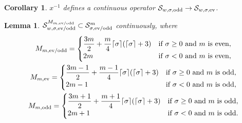 \documentclass[11pt]{article}
\newtheorem{Corollary}[Theorem]{Corollary}
\newtheorem{Lemma}[Theorem]{Lemma}
\renewcommand{\SS}{\mathcal{S}}
\begin{document}
\begin{Corollary}\label{c:x^-1:SS_w,sigma,odd to SS_w,sigma,ev}
  $x^{-1}$ defines a continuous operator $\SS_{w,\sigma,\text{\rm odd}}\to\SS_{w,\sigma,\text{\rm ev}}$.
\end{Corollary}

\begin{Lemma}\label{l:SS_w,sigma^M_m subset SS_sigma^m}
  $\SS_{w,\sigma,\text{\rm ev/odd}}^{M_{m,\text{\rm ev/odd}}}\subset\SS_{\sigma,\text{\rm ev/odd}}^m$ continuously, where
    \begin{gather*}
      M_{m,\text{\rm ev/odd}} =
        \begin{cases}
          \dfrac{3m}{2}+\dfrac{m}{4} \lceil\sigma\rceil(\lceil\sigma\rceil+3) & \text{if $\sigma\ge0$ and $m$ is even},\\
          2m & \text{if $\sigma<0$ and $m$ is even} ,
        \end{cases}
      \\
      M_{m,\text{\rm ev}} =
        \begin{cases}
          \dfrac{3m-1}{2}+\dfrac{m-1}{4} \lceil\sigma\rceil(\lceil\sigma\rceil+3) & \text{if $\sigma\ge0$ and $m$ is odd},\\
          2m-1 & \text{if $\sigma<0$ and $m$ is odd} ,
        \end{cases}
      \\
      M_{m,\text{\rm odd}} =
        \begin{cases}
          \dfrac{3m+1}{2}+\dfrac{m+1}{4} \lceil\sigma\rceil(\lceil\sigma\rceil+3)
          & \text{if $\sigma\ge0$ and $m$ is odd},\\
          2m+1 & \text{if $\sigma<0$ and $m$ is odd} .
        \end{cases}
    \end{gather*}
\end{Lemma}
\end{document}
